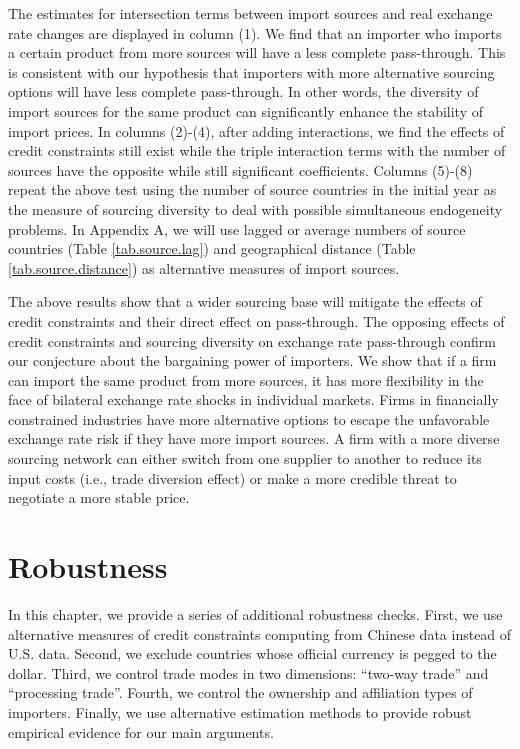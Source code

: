 \documentclass[12pt]{article}
\begin{document}
The estimates for intersection terms between import sources and real exchange rate changes are displayed in column (1). We find that an importer who imports a certain product from more sources will have a less complete pass-through. This is consistent with our hypothesis that importers with more alternative sourcing options will have less complete pass-through. In other words, the diversity of import sources for the same product can significantly enhance the stability of import prices. In columns (2)-(4), after adding interactions, we find the effects of credit constraints still exist while the triple interaction terms with the number of sources have the opposite while still significant coefficients. Columns (5)-(8) repeat the above test using the number of source countries in the initial year as the measure of sourcing diversity to deal with possible simultaneous endogeneity problems. In Appendix A, we will use lagged or average numbers of source countries (Table \ref{tab.source.lag}) and geographical distance (Table \ref{tab.source.distance}) as alternative measures of import sources.

The above results show that a wider sourcing base will mitigate the effects of credit constraints and their direct effect on pass-through. The opposing effects of credit constraints and sourcing diversity on exchange rate pass-through confirm our conjecture about the bargaining power of importers. We show that if a firm can import the same product from more sources, it has more flexibility in the face of bilateral exchange rate shocks in individual markets. Firms in financially constrained industries have more alternative options to escape the unfavorable exchange rate risk if they have more import sources. A firm with a more diverse sourcing network can either switch from one supplier to another to reduce its input costs (i.e., trade diversion effect) or make a more credible threat to negotiate a more stable price.

\section{Robustness} \label{Robustness}

In this chapter, we provide a series of additional robustness checks. First, we use alternative measures of credit constraints computing from Chinese data instead of U.S. data. Second, we exclude countries whose official currency is pegged to the dollar. Third, we control trade modes in two dimensions: ``two-way trade'' and ``processing trade''. Fourth, we control the ownership and affiliation types of importers. Finally, we use alternative estimation methods to provide robust empirical evidence for our main arguments.
\end{document}
